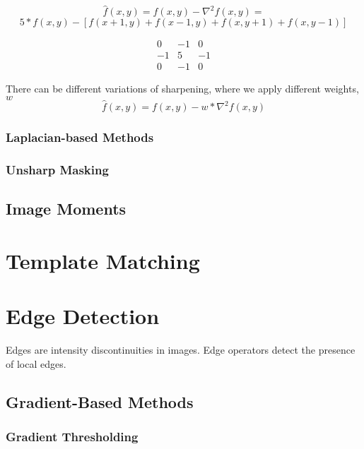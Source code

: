 \documentclass{article}
\begin{document}
\begin{multicols}{2}
\[\hat{f}(x,y) = f(x,y) - \nabla^{2}f(x,y)=\]
\[5*f(x,y)-[f(x+1,y)+f(x-1,y)+f(x,y+1)+f(x,y-1)]\]

\[
\begin{matrix}
  0 & -1 & 0\\
  -1 & 5 & -1\\
  0 & -1 & 0
\end{matrix}
\]


There can be different variations of sharpening, where we apply different weights, \(w\)
\[\hat{f}(x,y) = f(x,y) - w * \nabla^{2}f(x,y)\]

\subsubsection{Laplacian-based Methods}

\subsubsection{Unsharp Masking}

\subsection{Image Moments}

\section{Template Matching}

\section{Edge Detection}

Edges are intensity discontinuities in images. Edge operators detect the presence of local edges.

\subsection{Gradient-Based Methods}



\subsubsection{Gradient Thresholding}


\end{multicols}
\end{document}
